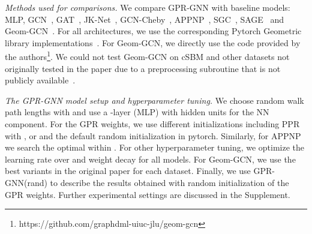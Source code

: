 \documentclass{article} \usepackage{iclr2021_conference,times}
\begin{document}
\emph{Methods used for comparisons.} We compare GPR-GNN with  baseline models: MLP, GCN~\citep{kipf2017semi}, GAT~\citep{velickovic2018graph}, JK-Net~\citep{xu2018representation}, GCN-Cheby~\citep{defferrard2016convolutional}, APPNP~\citep{klicpera2018predict}, SGC~\citep{wu2019simplifying}, SAGE~\citep{hamilton2017inductive} and Geom-GCN~\citep{pei2019geom}. For all architectures, we use the corresponding Pytorch Geometric library implementations~\citep{fey2019fast}. For Geom-GCN, we directly use the code provided by the authors\footnote{https://github.com/graphdml-uiuc-jlu/geom-gcn}. We could not test Geom-GCN on cSBM and other datasets not originally tested in the paper due to a preprocessing subroutine that is not publicly available~\citep{pei2019geom}.



\emph{The GPR-GNN model setup and hyperparameter tuning.} We choose random walk path lengths with  and use a -layer (MLP) with  hidden units for the NN component. For the GPR weights, we use different initializations including PPR with ,  or  and the default random initialization in pytorch. Similarly, for APPNP we search the optimal  within . For other hyperparameter tuning, we optimize the learning rate over  and weight decay  for all models. For Geom-GCN, we use the best variants in the original paper for each dataset. Finally, we use GPR-GNN(rand) to describe the results obtained with random initialization of the GPR weights. Further experimental settings are discussed in the Supplement. 
\end{document}
